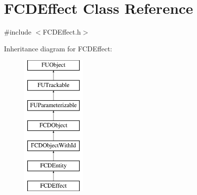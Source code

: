 \hypertarget{classFCDEffect}{
\section{FCDEffect Class Reference}
\label{classFCDEffect}
}


{\ttfamily \#include $<$FCDEffect.h$>$}

Inheritance diagram for FCDEffect:\begin{figure}[H]
\begin{center}
\leavevmode
\includegraphics[height=7.000000cm]{classFCDEffect}
\end{center}
\end{figure}
